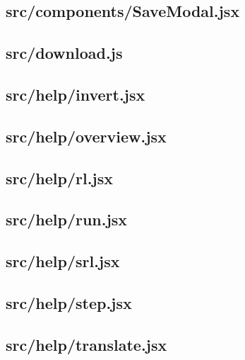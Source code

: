 \subsection{src/components/SaveModal.jsx}
\label{app:client_src_components_SaveModal_jsx}

\subsection{src/download.js}
\label{app:client_src_download_js}

\subsection{src/help/invert.jsx}
\label{app:client_src_help_invert_jsx}

\subsection{src/help/overview.jsx}
\label{app:client_src_help_overview_jsx}

\subsection{src/help/rl.jsx}
\label{app:client_src_help_rl_jsx}

\subsection{src/help/run.jsx}
\label{app:client_src_help_run_jsx}

\subsection{src/help/srl.jsx}
\label{app:client_src_help_srl_jsx}

\subsection{src/help/step.jsx}
\label{app:client_src_help_step_jsx}

\subsection{src/help/translate.jsx}
\label{app:client_src_help_translate_jsx}

